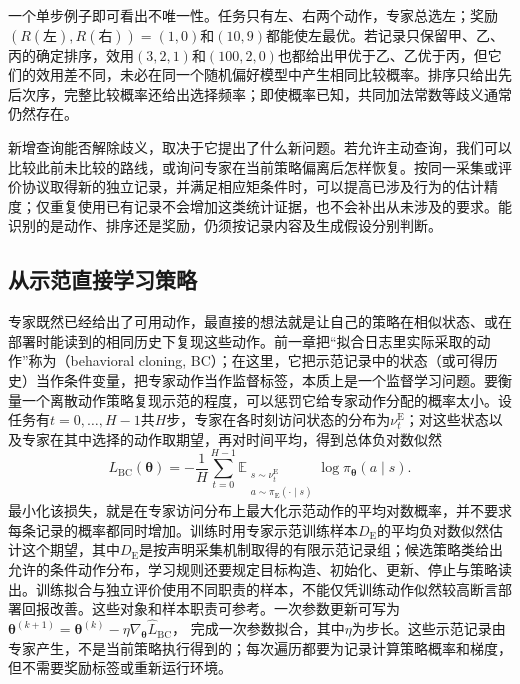 一个单步例子即可看出不唯一性。任务只有左、右两个动作，专家总选左；奖励$(R(\text{左}),R(\text{右}))=(1,0)$和$(10,9)$都能使左最优。若记录只保留甲、乙、丙的确定排序，效用$(3,2,1)$和$(100,2,0)$也都给出甲优于乙、乙优于丙，但它们的效用差不同，未必在同一个随机偏好模型中产生相同比较概率。排序只给出先后次序，完整比较概率还给出选择频率；即使概率已知，共同加法常数等歧义通常仍然存在。

新增查询能否解除歧义，取决于它提出了什么新问题。若允许主动查询，我们可以比较此前未比较的路线，或询问专家在当前策略偏离后怎样恢复。按同一采集或评价协议取得新的独立记录，并满足相应矩条件时，可以提高已涉及行为的估计精度；仅重复使用已有记录不会增加这类统计证据，也不会补出从未涉及的要求。能识别的是动作、排序还是奖励，仍须按记录内容及生成假设分别判断。

\subsection{从示范直接学习策略}
\label{sec:rl-reward-bc-dagger}

专家既然已经给出了可用动作，最直接的想法就是让自己的策略在相似状态、或在部署时能读到的相同历史下复现这些动作。前一章把“拟合日志里实际采取的动作”称为（behavioral cloning, BC）；在这里，它把示范记录中的状态（或可得历史）当作条件变量，把专家动作当作监督标签，本质上是一个监督学习问题。要衡量一个离散动作策略复现示范的程度，可以惩罚它给专家动作分配的概率太小。设任务有$t=0,\ldots,H-1$共$H$步，专家在各时刻访问状态的分布为$\nu_t^{\mathrm E}$；对这些状态以及专家在其中选择的动作取期望，再对时间平均，得到总体负对数似然
\begin{equation}
  L_{\mathrm{BC}}(\bm{\theta})
  =-\frac1H\sum_{t=0}^{H-1}
  \mathbb E_{\substack{s\sim\nu_t^{\mathrm E}\\
              a\sim\pi_{\mathrm E}(\cdot\mid s)}}
       \log\pi_{\bm{\theta}}(a\mid s).
  \label{eq:rl-reward-bc}
\end{equation}
最小化该损失，就是在专家访问分布上最大化示范动作的平均对数概率，并不要求每条记录的概率都同时增加。训练时用专家示范训练样本$D_{\mathrm E}$的平均负对数似然估计这个期望，其中$D_{\mathrm E}$是按声明采集机制取得的有限示范记录组；候选策略类给出允许的条件动作分布，学习规则还要规定目标构造、初始化、更新、停止与策略读出。训练拟合与独立评价使用不同职责的样本，不能仅凭训练动作似然较高断言部署回报改善。这些对象和样本职责可参考。一次参数更新可写为
$\bm{\theta}^{(k+1)}=\bm{\theta}^{(k)}
-\eta\nabla_{\bm{\theta}}\widehat L_{\mathrm{BC}}$，
完成一次参数拟合，其中$\eta$为步长。这些示范记录由专家产生，不是当前策略执行得到的；每次遍历都要为记录计算策略概率和梯度，但不需要奖励标签或重新运行环境。

